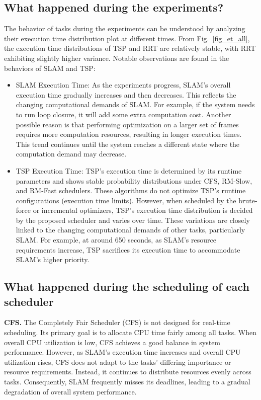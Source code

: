 	\subsection{What happened during the experiments?}
    The behavior of tasks during the experiments can be understood by analyzing their execution time distribution plot at different times. From Fig.~\ref{fig_et_all}, the execution time distributions of TSP and RRT are relatively stable, with RRT exhibiting slightly higher variance. Notable observations are found in the behaviors of SLAM and TSP:
    \begin{itemize}
    \item SLAM Execution Time:  
    As the experiments progress, SLAM’s overall execution time gradually increases and then decreases. This reflects the changing computational demands of SLAM. For example, if the system needs to run loop closure, it will add some extra computation cost. Another possible reason is that performing optimization on a larger set of frames requires more computation resources, resulting in longer execution times. This trend continues until the system reaches a different state where the computation demand may decrease.

    \item TSP Execution Time:  
    TSP’s execution time is determined by its runtime parameters and shows stable probability distributions under CFS, RM-Slow, and RM-Fast schedulers. These algorithms do not optimize TSP’s runtime configurations (\eg execution time limits).  
    However, when scheduled by the brute-force or incremental optimizers, TSP’s execution time distribution is decided by the proposed scheduler and varies over time. These variations are closely linked to the changing computational demands of other tasks, particularly SLAM. For example, at around 650 seconds, as SLAM’s resource requirements increase, TSP sacrifices its execution time to accommodate SLAM’s higher priority.
\end{itemize}

	
	\subsection{What happened during the scheduling of each scheduler}
	\textbf{CFS.} The Completely Fair Scheduler (CFS) is not designed for real-time scheduling. Its primary goal is to allocate CPU time fairly among all tasks. When overall CPU utilization is low, CFS achieves a good balance in system performance. However, as SLAM's execution time increases and overall CPU utilization rises, CFS does not adapt to the tasks' differing importance or resource requirements. Instead, it continues to distribute resources evenly across tasks. Consequently, SLAM frequently misses its deadlines, leading to a gradual degradation of overall system performance.
    
